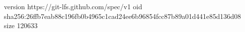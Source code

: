 version https://git-lfs.github.com/spec/v1
oid sha256:26ffb7eab88c196fb0b4965c1cad24ee6b96854fcc87b89a01d441e85d136d08
size 120633
